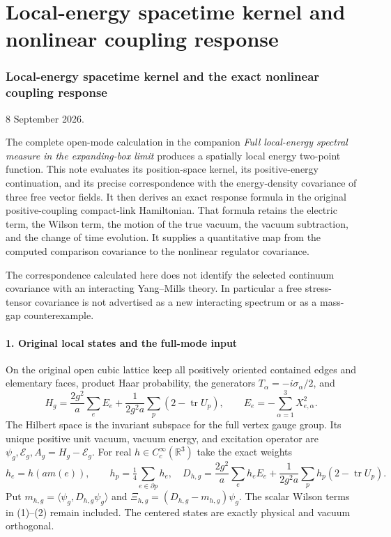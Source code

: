 \documentclass[
  11pt,
]{article}
\begin{document}
\clearpage
\part{Local-energy spacetime kernel and nonlinear coupling response}
\section{Local-energy spacetime kernel and the exact nonlinear coupling
response}\label{weak-coupling-part-11-local-energy-spacetime-kernel-and-the-exact-nonlinear-coupling-response}

8 September 2026.

The complete open-mode calculation in the companion \emph{Full
local-energy spectral measure in the expanding-box limit} produces a
spatially local energy two-point function. This note evaluates its
position-space kernel, its positive-energy continuation, and its precise
correspondence with the energy-density covariance of three free vector
fields. It then derives an exact response formula in the original
positive-coupling compact-link Hamiltonian. That formula retains the
electric term, the Wilson term, the motion of the true vacuum, the
vacuum subtraction, and the change of time evolution. It supplies a
quantitative map from the computed comparison covariance to the
nonlinear regulator covariance.

The correspondence calculated here does not identify the selected
continuum covariance with an interacting Yang--Mills theory. In
particular a free stress-tensor covariance is not advertised as a new
interacting spectrum or as a mass-gap counterexample.

\subsection{1. Original local states and the full-mode
input}\label{weak-coupling-part-11-original-local-states-and-the-full-mode-input}

On the original open cubic lattice keep all positively oriented
contained edges and elementary faces, product Haar probability, the
generators \(T_\alpha=-i\sigma_\alpha/2\), and \[
 H_g=\frac{2g^2}{a}\sum_eE_e+
                 \frac1{2g^2a}\sum_p(2-\operatorname{tr}U_p),
 \qquad E_e=-\sum_{\alpha=1}^3X_{e,\alpha}^2.
 \tag{1}
\] The Hilbert space is the invariant subspace for the full vertex gauge
group. Its unique positive unit vacuum, vacuum energy, and excitation
operator are \(\psi_g,\mathcal E_g,A_g=H_g-\mathcal E_g\). For real
\(h\in C_c^\infty(\mathbb R^3)\) take the exact weights \[
 h_e=h(am(e)),\qquad h_p=\tfrac14\sum_{e\in\partial p}h_e,
 \quad D_{h,g}=\frac{2g^2}{a}\sum_eh_eE_e+
          \frac1{2g^2a}\sum_ph_p(2-\operatorname{tr}U_p).
 \tag{2}
\] Put \(m_{h,g}=\langle\psi_g,D_{h,g}\psi_g\rangle\) and
\(\Xi_{h,g}=(D_{h,g}-m_{h,g})\psi_g\). The scalar Wilson terms in
(1)--(2) remain included. The centered states are exactly physical and
vacuum orthogonal.
\end{document}

